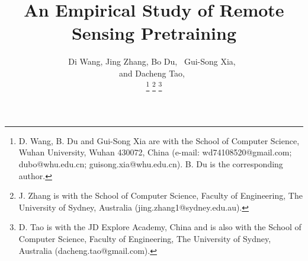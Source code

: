 \documentclass[10pt, journal,twoside]{IEEEtran}
\begin{document}
\title{An Empirical Study of Remote Sensing Pretraining}


\author{Di Wang,
        Jing Zhang,
        Bo Du,~
        Gui-Song Xia,~\\
        and Dacheng Tao,~
        
\thanks{D. Wang, B. Du and Gui-Song Xia are with the School of Computer Science, Wuhan University, Wuhan 430072, China (e-mail: wd74108520@gmail.com; dubo@whu.edu.cn; guisong.xia@whu.edu.cn). B. Du is the corresponding author.}
\thanks{J. Zhang is with the School of Computer Science, 
Faculty of Engineering, The University of Sydney, Australia (jing.zhang1@sydney.edu.au).}
\thanks{D. Tao is with the JD Explore Academy, China and is also with the School of Computer Science, Faculty of Engineering, The University of Sydney, Australia (dacheng.tao@gmail.com).}
}



















\maketitle
\end{document}
